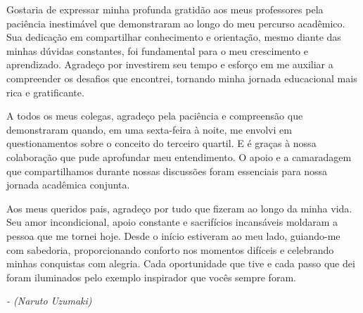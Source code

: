 \documentclass[
	12pt,			%
	openany,		%
	oneside,		%
	a4paper,		%
	english,		%
	brazil			%
	]{abntex2}
\begin{document}
\begin{agradecimentos}
  
	Gostaria de expressar minha profunda gratidão aos meus professores pela paciência inestimável que demonstraram ao longo do meu percurso acadêmico. Sua dedicação em compartilhar conhecimento e orientação, mesmo diante das minhas dúvidas constantes, foi fundamental para o meu crescimento e aprendizado. Agradeço por investirem seu tempo e esforço em me auxiliar a compreender os desafios que encontrei, tornando minha jornada educacional mais rica e gratificante.\par
	A todos os meus colegas, agradeço pela paciência e compreensão que demonstraram quando, em uma sexta-feira à noite, me envolvi em questionamentos sobre o conceito do terceiro quartil. E é graças à nossa colaboração que pude aprofundar meu entendimento. O apoio e a camaradagem que compartilhamos durante nossas discussões foram essenciais para nossa jornada acadêmica conjunta. \par	
	Aos meus queridos pais, agradeço por tudo que fizeram ao longo da minha vida. Seu amor incondicional, apoio constante e sacrifícios incansáveis moldaram a pessoa que me tornei hoje. Desde o início estiveram ao meu lado, guiando-me com sabedoria, proporcionando conforto nos momentos difíceis e celebrando minhas conquistas com alegria. Cada oportunidade que tive e cada passo que dei foram iluminados pelo exemplo inspirador que vocês sempre foram.

\end{agradecimentos}

\begin{epigrafe}
   \vspace*{\fill}
   \begin{flushright}
	\textit{ - (Naruto Uzumaki)}
   \end{flushright}
\end{epigrafe}

\setlength{\absparsep}{18pt} %
\end{document}
